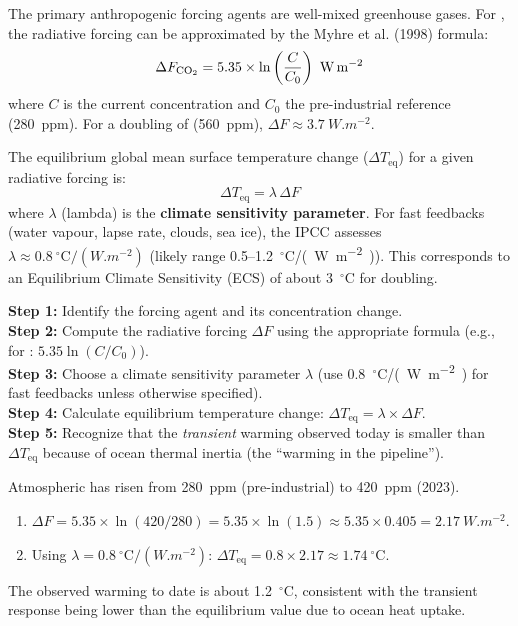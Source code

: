 \documentclass[11pt]{article}
\begin{document}
The primary anthropogenic forcing agents are well-mixed greenhouse gases. For , the radiative forcing can be approximated by the Myhre et al. (1998) formula:
\[
\Delta F_{\ce{CO2}} = 5.35 \times \ln\left(\frac{C}{C_0}\right)\ \mathrm{W\,m^{-2}}
\]
where $C$ is the current concentration and $C_0$ the pre-industrial reference (\SI{280}{ppm}). For a doubling of  (\SI{560}{ppm}), $\Delta F \approx \SI{3.7}{W.m^{-2}}$.

\begin{propriete}
The equilibrium global mean surface temperature change ($\Delta T_{\mathrm{eq}}$) for a given radiative forcing is:
\[
\Delta T_{\mathrm{eq}} = \lambda \, \Delta F
\]
where $\lambda$ (lambda) is the \textbf{climate sensitivity parameter}. For fast feedbacks (water vapour, lapse rate, clouds, sea ice), the IPCC assesses $\lambda \approx \SI{0.8}{\ensuremath{{}^{\circ}\mathrm{C}}/(W.m^{-2})}$ (likely range \num{0.5}--\SI{1.2}{\ensuremath{{}^{\circ}\mathrm{C}}/(W.m^{-2})}). This corresponds to an Equilibrium Climate Sensitivity (ECS) of about \SI{3}{\ensuremath{{}^{\circ}\mathrm{C}}} for  doubling.
\end{propriete}

\begin{methode}
\textbf{Step 1:} Identify the forcing agent and its concentration change.\\
\textbf{Step 2:} Compute the radiative forcing $\Delta F$ using the appropriate formula (e.g., for : $5.35 \ln(C/C_0)$).\\
\textbf{Step 3:} Choose a climate sensitivity parameter $\lambda$ (use \SI{0.8}{\ensuremath{{}^{\circ}\mathrm{C}}/(W.m^{-2})} for fast feedbacks unless otherwise specified).\\
\textbf{Step 4:} Calculate equilibrium temperature change: $\Delta T_{\mathrm{eq}} = \lambda \times \Delta F$.\\
\textbf{Step 5:} Recognize that the \emph{transient} warming observed today is smaller than $\Delta T_{\mathrm{eq}}$ because of ocean thermal inertia (the ``warming in the pipeline'').
\end{methode}

\begin{exemplebox}
Atmospheric  has risen from \SI{280}{ppm} (pre-industrial) to \SI{420}{ppm} (2023).
\begin{enumerate}
\item $\Delta F = 5.35 \times \ln(420/280) = 5.35 \times \ln(1.5) \approx 5.35 \times 0.405 = \SI{2.17}{W.m^{-2}}$.
\item Using $\lambda = \SI{0.8}{\ensuremath{{}^{\circ}\mathrm{C}}/(W.m^{-2})}$: $\Delta T_{\mathrm{eq}} = 0.8 \times 2.17 \approx \SI{1.74}{\ensuremath{{}^{\circ}\mathrm{C}}}$.
\end{enumerate}
The observed warming to date is about \SI{1.2}{\ensuremath{{}^{\circ}\mathrm{C}}}, consistent with the transient response being lower than the equilibrium value due to ocean heat uptake.
\end{exemplebox}
\end{document}
